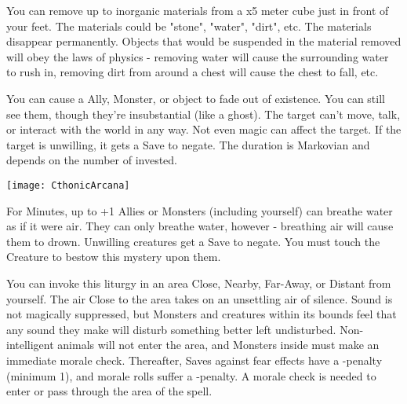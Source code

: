 {\MYSTERY [
  Name = Excavate,
  Link = arcana-mystery-excavate,
  Paradigm = Elements,
  Save = N,
  Duration = Instant,
  Target = Close
]

You can remove up to \DICE inorganic materials from a \DICE x5 meter cube just in front of your feet.  The materials could be "stone", "water", "dirt", etc. The materials disappear permanently. Objects that would be suspended in the material removed will obey the laws of physics - removing water will cause the surrounding water to rush in, removing dirt from around a chest will cause the chest to fall, etc.

\MYSTERY [
  Name = Fade,
  Link = arcana-mystery-fade,
  Paradigm = Mind,
  Save = Y (neg.),
  Duration = Markovian,
  Target = Nearby Target(s)
]

You can cause a Ally, Monster, or object to fade out of existence.  You can still see them, though they're insubstantial (like a ghost).  The target can't move, talk, or interact with the world in any way.  Not even magic can affect the target.  If the target is unwilling, it gets a Save to negate.  The duration is Markovian and depends on the number of \DICE invested.

  \begin{center}
  \texttt{[image: CthonicArcana]}
  \end{center}


\MYSTERY [
  Name = Mermaid's Breath,
  Link = arcana-mystery-mermaids-breath,
  Paradigm = Biomancy,
  Save = Y (neg.),
  Duration = \SUM Minutes,
  Target = Self or Close Target(s)
]

For \SUMDICE Minutes, up to \DICE+1 Allies or Monsters (including yourself) can breathe water as if it were air.  They can only breathe water, however - breathing air will cause them to drown. Unwilling creatures get a Save to negate.  You must touch the Creature to bestow this mystery upon them. 

\MYSTERY [
  Name = Sinister Stillness,
  Link = arcana-mystery-sinister-stillness,
  Paradigm = Mind,
  Save = N,
  Duration = Combat or \SUM Minutes,
  Target = Close\, Nearby\, Far-Away\, or Distant
]

You can invoke this liturgy in an area  Close, Nearby, Far-Away, or Distant from yourself.  The air Close to the area takes on an unsettling air of silence.  Sound is not magically suppressed, but Monsters and creatures within its bounds feel that any sound they make will disturb something better left undisturbed.  Non-intelligent animals will not enter the area, and Monsters inside must make an immediate morale check. Thereafter, Saves against fear effects have a -\DICE penalty (minimum 1), and morale rolls suffer a -\DICE penalty.  A morale check is needed to enter or pass through the area of the spell.

}
